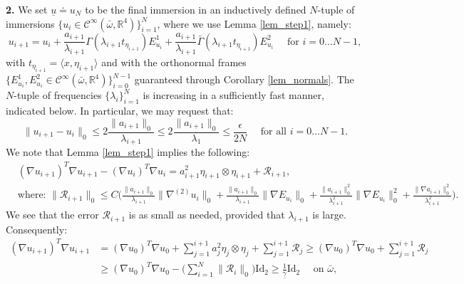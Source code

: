\documentclass[reqno,twoside,11pt]{amsart}
\newcommand{\Id}{\mathrm{Id}}
\newcommand{\R}{\mathbb{R}}
\numberwithin{equation}{section}
\theoremstyle{plain}
\theoremstyle{definition}
\begin{document}
\smallskip

{\bf 2.} We set $\underline u \doteq u_N$ to be the final immersion in
an inductively defined $N$-tuple of immersions $\{u_i\in\mathcal{C}^{\infty}(\bar\omega, \R^4)\}_{i=1}^N$,
where we use Lemma \ref{lem_step1}, namely:
\begin{equation}\label{def_alan}
u_{i+1}=u_i+\frac{a_{i+1}}{\lambda_{i+1}}\Gamma(\lambda_{i+1}t_{\eta_{i+1}})E^1_{u_i}
+ \frac{a_{i+1}}{\lambda_{i+1}}\bar\Gamma(\lambda_{i+1}t_{\eta_{i+1}})E^2_{u_i}
\quad\mbox{ for } i=0\ldots N-1,
\end{equation}
with $t_{\eta_{i+1}} = \langle x, \eta_{i+1}\rangle$ and with 
the orthonormal frames $\{E^1_{u_i},
E^2_{u_i}\in\mathcal{C}^{\infty}(\bar\omega, \R^4)\}_{i=0}^{N-1}$
guaranteed through Corollary \ref{lem_normals}. The $N$-tuple of frequencies
$\{\lambda_i\}_{i=1}^N$ is increasing in a sufficiently fast manner,
indicated below. In particular, we may request that:
\begin{equation}\label{0c}
\|u_{i+1}-u_i\|_0\leq 2\frac{\|a_{i+1}\|_0}{\lambda_{i+1}}\leq
2\frac{\|a_{i+1}\|_0}{\lambda_{1}}\leq\frac{\epsilon}{2N} \quad
\mbox{ for all } i=0\ldots N-1.
\end{equation}
We note that Lemma \ref{lem_step1} implies the following:
\begin{equation*}
\begin{split}
& (\nabla u_{i+1})^T \nabla u_{i+1} - (\nabla u_{i})^T \nabla u_{i} =
a_{i+1}^2\eta_{i+1}\otimes\eta_{i+1} +\mathcal{R}_{i+1},\\
& \mbox{where: }
\|\mathcal{R}_{i+1}\|_0 \leq C \Big(\frac{\|a_{i+1}\|_0}{\lambda_{i+1}} \|\nabla^{(2)}u_i\|_0
+ \frac{\|a_{i+1}\|_0}{\lambda_{i+1}} \|\nabla E_{u_i}\|_0
+ \frac{\|a_{i+1}\|^2_0}{\lambda_{i+1}^2} \|\nabla E_{u_i}\|_0^2 +
\frac{\|\nabla a_{i+1}\|^2_0}{\lambda_{i+1}^2}\Big).
\end{split}
\end{equation*}
We see that the error $\mathcal{R}_{i+1}$ is as small as needed, provided that $\lambda_{i+1}$ is large.
Consequently:
\begin{equation}\label{b5}
\begin{split}  
(\nabla u_{i+1})^T \nabla u_{i+1} & = (\nabla u_0)^T \nabla u_0 +
\sum_{j=1}^{i+1}a_j^2\eta_j\otimes\eta_j  + \sum_{j=1}^{i+1}\mathcal{R}_j \geq 
(\nabla u_0)^T \nabla u_0 + \sum_{j=1}^{i+1}\mathcal{R}_j \\ & \geq (\nabla u_0)^T \nabla u_0 -
\Big(\sum_{i=1}^{N}\|\mathcal{R}_i \|_0\Big)\Id_2\geq
\frac{1}{\underline\gamma}\Id_2 \quad\mbox{ on } \bar\omega,
\end{split}
\end{equation}
\end{document}
